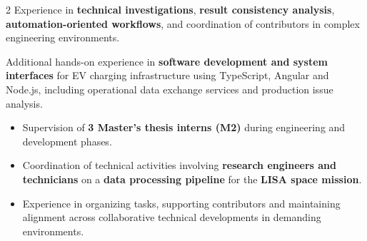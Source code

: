 \documentclass[8pt,a4paper,ragged2e,withhyper]{../_shared/altacv}
\begin{document}
\begin{paracol}{2}
Experience in \textbf{technical investigations}, \textbf{result consistency analysis}, \textbf{automation-oriented workflows}, and coordination of contributors in complex engineering environments.

Additional hands-on experience in \textbf{software development and system interfaces} for EV charging infrastructure using TypeScript, Angular and Node.js, including operational data exchange services and production issue analysis.


\begin{itemize}
  \item Supervision of \textbf{3 Master’s thesis interns (M2)} during engineering and development phases.
  \item Coordination of technical activities involving \textbf{research engineers and technicians} on a \textbf{data processing pipeline} for the \textbf{LISA space mission}.
  \item Experience in organizing tasks, supporting contributors and maintaining alignment across collaborative technical developments in demanding environments.
\end{itemize}

{}
\divider

\divider


\medskip

\divider



\divider
{}
\divider
{}



\end{paracol}
\end{document}

